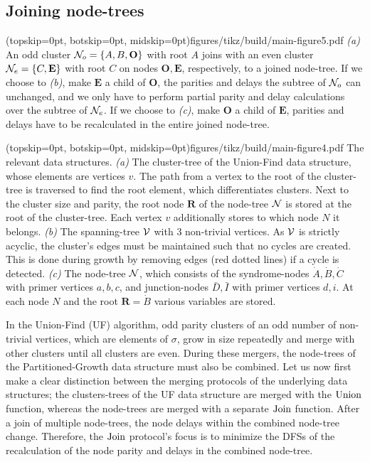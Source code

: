 \subsection{Joining node-trees}\label{sec:nodejoin}

\Figure[b](topskip=0pt, botskip=0pt, midskip=0pt){figures/tikz/build/main-figure5.pdf}{
    \emph{(a)} An odd cluster $\mathcal{N}_o=\{A, B, \mathbf{O}\}$ with root $A$ joins with an even cluster $\mathcal{N}_e=\{C, \mathbf{E}\}$ with root $C$ on nodes $\mathbf{O}, \mathbf{E}$, respectively, to a joined node-tree. If we choose to \emph{(b)}, make $\mathbf{E}$ a child of $\mathbf{O}$, the parities and delays the subtree of $\mathcal{N}_o$ can unchanged, and we only have to perform partial parity and delay calculations over the subtree of $\mathcal{N}_e$. If we choose to \emph{(c)}, make $\mathbf{O}$ a child of $\mathbf{E}$, parities and delays have to be recalculated in the entire joined node-tree. \label{fig:inversion}}

\Figure[tb](topskip=0pt, botskip=0pt, midskip=0pt){figures/tikz/build/main-figure4.pdf}{
    The relevant data structures. \emph{(a)} The cluster-tree of the Union-Find data structure, whose elements are vertices $v$. The path from a vertex to the root of the cluster-tree is traversed to find the root element, which differentiates clusters. Next to the cluster size and parity, the root node $\mathbf{R}$ of the node-tree $\mathcal{N}$ is stored at the root of the cluster-tree. Each vertex $v$ additionally stores to which node $N$ it belongs. \emph{(b)} The spanning-tree $\mathcal{V}$ with 3 non-trivial vertices. As $\mathcal{V}$ is strictly acyclic, the cluster's edges must be maintained such that no cycles are created. This is done during growth by removing edges (red dotted lines) if a cycle is detected. \emph{(c)} The node-tree $\mathcal{N}$, which consists of the syndrome-nodes $\dot{A}, \dot{B}, \dot{C}$ with primer vertices $a, b, c$, and junction-nodes $\bar{D}, \bar{I}$ with primer vertices $d,i$. At each node $N$ and the root $\mathbf{R}=\dot{B}$ various variables are stored.\label{fig:nodetypes}}


In the Union-Find (UF) algorithm, odd parity clusters of an odd number of non-trivial vertices, which are elements of $\sigma$, grow in size repeatedly and merge with other clusters until all clusters are even. During these mergers, the node-trees of the Partitioned-Growth data structure must also be combined. Let us now first make a clear distinction between the merging protocols of the underlying data structures; the clusters-trees of the UF data structure are merged with the $\operatorname{Union}$ function, whereas the node-trees are merged with a separate $\operatorname{Join}$ function. After a join of multiple node-trees, the node delays within the combined node-tree change. Therefore, the $\operatorname{Join}$ protocol's focus is to minimize the DFSs of the recalculation of the node parity and delays in the combined node-tree. 

